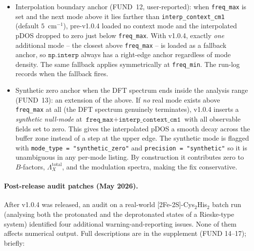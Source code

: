 \documentclass[11pt,a4paper,twoside]{article}
\theoremstyle{remark}
\begin{document}
\begin{itemize}
  \item Interpolation boundary anchor (FUND~12, user-reported):
        when \texttt{freq\_max} is set and the next mode above it
        lies farther than \texttt{interp\_context\_cm1} (default
        $5$~cm$^{-1}$), pre-v1.0.4 loaded no context mode and the
        interpolated pDOS dropped to zero just below
        \texttt{freq\_max}. With v1.0.4, exactly \emph{one} additional
        mode -- the closest above \texttt{freq\_max} -- is loaded
        as a fallback anchor, so $\texttt{np.interp}$ always has a
        right-edge anchor regardless of mode density. The same
        fallback applies symmetrically at \texttt{freq\_min}. The
        run-log records when the fallback fires.
  \item Synthetic zero anchor when the DFT spectrum ends inside the
        analysis range (FUND~13): an extension of the above. If
        \emph{no} real mode exists above \texttt{freq\_max} at all
        (the DFT spectrum genuinely terminates), v1.0.4 inserts a
        \emph{synthetic null-mode} at
        $\texttt{freq\_max} + \texttt{interp\_context\_cm1}$ with all
        observable fields set to zero. This gives the interpolated
        pDOS a smooth decay across the buffer zone instead of a step
        at the upper edge. The synthetic mode is flagged with
        \texttt{mode\_type = "synthetic\_zero"} and
        \texttt{precision = "synthetic"} so it is unambiguous in any
        per-mode listing. By construction it contributes zero to
        $B$-factors, $\Lambda_X^\text{total}$, and the modulation
        spectra, making the fix conservative.
\end{itemize}

\paragraph{Post-release audit patches (May 2026).} After v1.0.4
was released, an audit on a real-world [2Fe-2S]-Cys$_2$His$_2$
batch run (analysing both the protonated and the deprotonated
states of a Rieske-type system) identified four additional
warning-and-reporting issues. None of them affects numerical
output. Full descriptions are in the supplement
(FUND 14--17); briefly:
\end{document}
